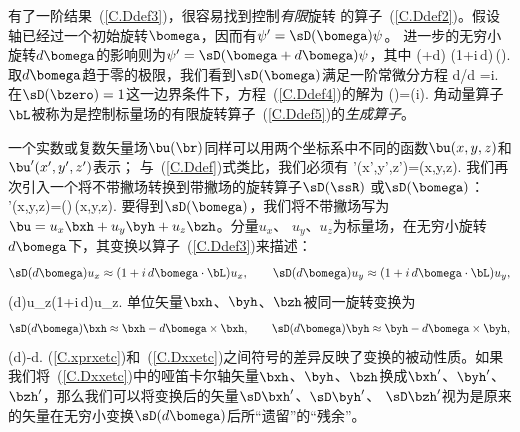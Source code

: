 有了一阶结果~(\ref{C.Ddef3})，很容易找到控制{\em 有限\/}旋转
%
%
的算子~(\ref{C.Ddef2})。假设
轴已经过一个初始旋转$\bomega$，因而有$\psi'=\sD(\bomega)\psi$。
进一步的无穷小旋转$d\/\bomega$的影响则为$\psi'=\sD(\bomega+d\bomega)\psi$，其中
\eq \label{C.Dinfdef}
\sD(\bomega+d\/\bomega)\approx
(1+i\,d\/\bomega\cdot\bL)\,\sD(\bomega).
\en
取$d\/\bomega$趋于零的极限，我们看到$\sD(\bomega)$满足一阶常微分方程
\eq \label{C.Ddef4}
d\sD\hspace{-0.3 mm}/\hspace{-0.3 mm}d\bomega
=i\bL\sD.
\en
在$\sD(\bzero)=1$这一边界条件下，方程~(\ref{C.Ddef4})的解为
\eq \label{C.Ddef5}
\sD(\bomega)=\exp(i\bomega\cdot\bL).
\en
角动量算子$\bL$被称为是控制标量场的有限旋转算子~(\ref{C.Ddef5})的{\em 生成算子\/}。
%
%

一个实数或复数矢量场$\bu(\br)$同样可以用两个坐标系中不同的函数$\bu(x,y,z)$和 $\bu'(x',y',z')$表示；
与~(\ref{C.Ddef})式类比，我们必须有
\eq \label{C.uprequ}
\bu'(x',y',z')=\bu(x,y,z).
\en
我们再次引入一个将不带撇场转换到带撇场的旋转算子$\sD(\ssR)$
或$\sD(\bomega)$：
\eq \label{C.vecDdef}
\bu'(x,y,z)=\sD(\bomega)\,\bu(x,y,z).
\en
要得到$\sD(\bomega)$，我们将不带撇场写为$\bu=u_x\bxh+u_y\byh+u_z\bzh$。分量$u_x$、 $u_y$、$u_z$为标量场，在无穷小旋转$d\bomega$下，其变换以算子~(\ref{C.Ddef3})来描述：
\begin{displaymath}
\sD(d\bomega)u_x\approx(1+i\,d\/\bomega\cdot\bL)u_x,\qquad
\sD(d\bomega)u_y\approx(1+i\,d\/\bomega\cdot\bL)u_y,
\end{displaymath}
\eq \label{C.uxyz}
\qquad\qquad\qquad
\sD(d\bomega)u_z\approx(1+i\,d\/\bomega\cdot\bL)u_z.
\en
单位矢量$\bxh$、$\byh$、$\bzh$被同一旋转变换为
\begin{displaymath}
\sD(d\bomega)\bxh\approx\bxh-d\/\bomega\times\bxh,\qquad
\sD(d\bomega)\byh\approx\byh-d\/\bomega\times\byh,
\end{displaymath}
\eq \label{C.Dxxetc}
\qquad\qquad\qquad
\sD(d\bomega)\bzh\approx\bzh-d\/\bomega\times\bzh.
\en
(\ref{C.xprxetc})和~(\ref{C.Dxxetc})之间符号的差异反映了变换的被动性质。如果我们将~(\ref{C.Dxxetc})中的哑笛卡尔轴矢量$\bxh$、$\byh$、$\bzh$换成$\bxh'$、$\byh'$、 $\bzh'$，那么我们可以将变换后的矢量$\sD\bxh'$、$\sD\byh'$、 $\sD\bzh'$视为是原来的矢量在无穷小变换$\sD(d\bomega)$后所“遗留”的“残余”。

